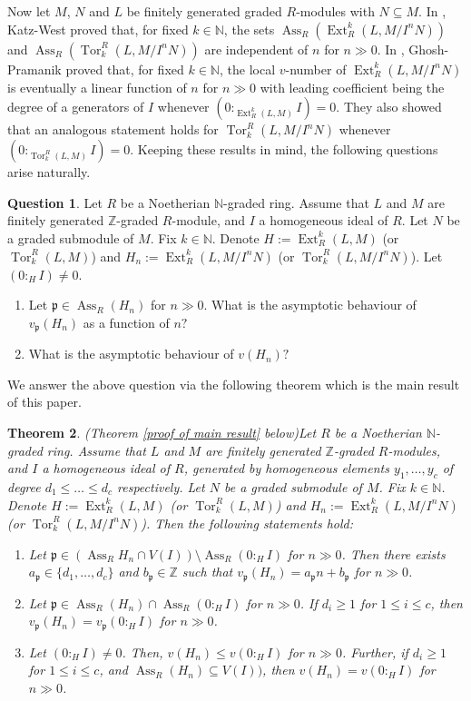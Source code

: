 \documentclass[11pt,reqno]{amsart}
\newtheorem{theorem}{Theorem}[section]
\theoremstyle{definition}
\newtheorem{question}[theorem]{Question}
\newcommand{\p}{\mathfrak{p}}
\newcommand{\Z}{\mathbb{Z}}
\newcommand{\N}{\mathbb{N}}
\newcommand{\Ass}{\operatorname{Ass}}
\newcommand{\Ext}{\operatorname{Ext}}
\newcommand{\Tor}{\operatorname{Tor}}
\begin{document}
Now let $M$, $N$ and $L$ be finitely generated graded $R$-modules with $N\subseteq M$. In \cite[Corollary 3.5]{KW04}, Katz-West proved that, for fixed $k\in \N$, the sets $\Ass_R(\Ext^k_R(L,M/I^nN))$ and  $\Ass_R(\Tor_k^R(L,M/I^nN))$ are independent of $n$ for $n\gg 0$.  In \cite{GP25}, Ghosh-Pramanik proved that, for fixed $k\in \N$, the local $v$-number of $\Ext^k_R(L, M/I^nN)$ is eventually a linear function of $n$ for $n\gg0$ with leading coefficient being the degree of a generators of $I$ whenever $(0:_{\Ext^k_R(L,M)}I)=0.$ They also showed that an analogous statement holds for $\Tor_k^R(L,M/I^nN)$  whenever $(0:_{\Tor_k^R(L,M)}I)=0.$ Keeping these results in mind, the following questions arise naturally.
\begin{question}
Let $R$ be a Noetherian $\N$-graded ring. Assume that $L$ and  $M$ are finitely generated $\Z$-graded $R$-module, and $I$ a homogeneous ideal of $R$. Let $N$ be a graded submodule of $M$. Fix $k\in \N$. Denote $H:=\Ext^k_R(L,M)$ (or $\Tor_k^R(L,M)$) and $H_n:=\Ext^k_R(L, M/I^nN)$ (or $\Tor_k^R(L,M/I^nN)$). Let $(0:_HI)\neq 0$.
\begin{enumerate}
    \item Let $\p\in \Ass_R(H_n)$ for $n\gg 0$. What is the asymptotic behaviour of $v_\p(H_n)$ as a function of $n?$
    \item What is the asymptotic behaviour of $v(H_n)?$
\end{enumerate}
\end{question}
We answer the above question via the following theorem which is the main result of this paper.
\begin{theorem}(Theorem \ref{proof of main result} below)\label{main result}
   Let $R$ be a Noetherian $\N$-graded ring. Assume that $L$ and  $M$ are finitely generated $\Z$-graded $R$-modules, and $I$ a homogeneous ideal of $R$,  generated by homogeneous elements $y_1,\ldots,y_c$ of degree $d_1\leq\ldots\leq d_c$ respectively. Let $N$ be a graded submodule of $M$. Fix $k\in \N$. Denote $H:=\Ext^k_R(L,M)$ (or $\Tor_k^R(L,M)$) and $H_n:=\Ext^k_R(L, M/I^nN)$ (or $\Tor_k^R(L,M/I^nN)$). Then the following statements hold:
   \begin{enumerate}[label=(\arabic*), font=\upshape]
       \item  Let $\p\in \left(\Ass_R H_n\cap V(I)\right)\setminus \Ass_R(0:_HI)$ for $n\gg 0$. Then there exists $a_\p\in\{d_1,\ldots,d_c\}$ and $b_\p\in \Z$ such that $v_{\p}(H_n)=a_\p n+b_\p$ for $n\gg 0$.
       \item  Let $\p\in \Ass_R(H_n)\cap \Ass_R(0:_HI)$ for $n\gg 0$. If $d_i\geq 1$ for $1\leq i\leq c$, then $v_{\p}(H_n)=v_{\p}(0:_HI)$ for $n\gg 0$.
       \item Let $(0:_HI)\neq 0$. Then, $v(H_n)\leq v(0:_HI)$ for $n\gg 0$. Further, if $d_i\geq 1$ for $1\leq i\leq c$, and $\Ass_R(H_n)\subseteq V(I))$, then $v(H_n)= v(0:_HI)$ for $n\gg 0$. 
   \end{enumerate}
\end{theorem}
\end{document}
